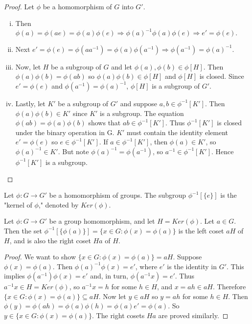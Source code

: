 \documentclass[a4paper,8pt]{article}
\begin{document}
\begin{outline}
    \begin{proof}
      Let \(\phi\) be a homomorphism of \(G\) into \(G'\).
      \begin{enumerate}[i.]
        \item
          Then \(\phi(a) = \phi(ae) = \phi(a)\phi(e) \Rightarrow \phi(a)^{-1}\phi(a)\phi(e) \Rightarrow e' = \phi(e)\).
        \item
          Next \(e' = \phi(e) = \phi(aa^{-1}) = \phi(a)\phi(a^{-1}) \Rightarrow \phi(a^{-1}) = \phi(a)^{-1}\).
        \item
          Now, let \(H\) be a subgroup of \(G\) and let \(\phi(a), \phi(b) \in \phi[H]\). Then \(\phi(a)\phi(b) =
          \phi(ab)\) so \(\phi(a)\phi(b) \in \phi[H]\) and \(\phi[H]\) is closed. Since \(e' = \phi(e)\) and
          \(\phi(a^{-1}) = \phi(a)^{-1}\), \(\phi[H]\) is a subgroup of \(G'\).
        \item
          Lastly, let \(K'\) be a subgroup of \(G'\) and suppose \(a, b \in \phi^{-1}[K']\). Then
          \(\phi(a)\phi(b) \in K'\) since \(K'\) is a subgroup. The equation \(\phi(ab) = \phi(a)\phi(b)\) shows that
          \(ab \in \phi^{-1}[K']\). Thus \(\phi^{-1}[K']\) is closed under the binary operation in G. \(K'\) must contain
          the identity element \(e' = \phi(e)\) so \(e \in \phi^{-1}[K']\). If \(a \in \phi^{-1}[K']\), then
          \(\phi(a) \in K'\), so \(\phi(a)^{-1} \in K'\). But note \(\phi(a)^{-1} = \phi(a^{-1})\), so \(a^{-1} \in
          \phi^{-1}[K']\). Hence \(\phi^{-1}[K']\) is a subgroup.
      \end{enumerate}
    \end{proof}

    Let \(\phi: G \rightarrow G'\) be a homomorphism of groups. The subgroup \(\phi^{-1}[\{e\}]\) is
    the "kernel of \(\phi\)," denoted by \(Ker(\phi)\).

    Let \(\phi: G \rightarrow G'\) be a group homomorphism, and let \(H = Ker(\phi)\). Let \(a \in G\).
    Then the set \(\phi^{-1}[\{\phi(a)\}] = \{x \in G : \phi(x) = \phi(a)\}\) is the left coset \(aH\) of \(H\), and is
    also the right coset \(Ha\) of \(H\).

    \begin{proof}
      We want to show \(\{x \in G : \phi(x) = \phi(a)\} = aH\). Suppose \(\phi(x) = \phi(a)\). Then \(\phi(a)^{-1}\phi(x)
      = e'\), where \(e'\) is the identity in \(G'\). This implies \(\phi(a^{-1})\phi(x) = e'\) and, in turn, \(\phi(a^{-1}x)
      = e'\). Thus \(a^{-1}x \in H = Ker(\phi)\), so \(a^{-1}x = h\) for some \(h \in H\), and \(x = ah \in aH\). Therefore
      \(\{x \in G : \phi(x) = \phi(a)\} \subseteq aH\). Now let \(y \in aH\) so \(y = ah\) for some \(h \in H\). Then
      \(\phi(y) = \phi(ah) = \phi(a)\phi(h) = \phi(a)e' = \phi(a)\). So \(y \in \{x \in G : \phi(x) = \phi(a)\}\). The
      right cosets \(Ha\) are proved similarly.
    \end{proof}


\end{outline}
\end{document}
